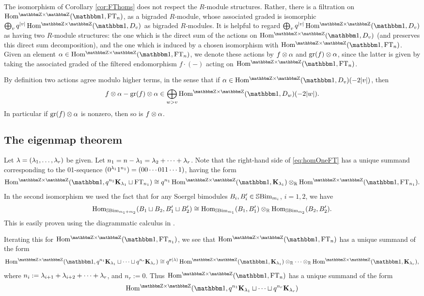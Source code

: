 The isomorphism of Corollary \ref{cor:FThoms} does not respect the $R$-module structures.  Rather, there is a filtration on $\Homgg(\one,\FT_n)$, as a bigraded $R$-module, whose associated graded is isomorphic $\bigoplus_v q^{|v|} \Homgg(\one,D_v)$ as bigraded $R$-modules.  It is helpful to regard $\bigoplus_v q^{|v|}\Homgg(\one,D_v)$ as having two $R$-module structures: the one which is the direct sum of the actions on $\Homgg(\one,D_v)$ (and preserves this direct sum decomposition), and the one which is induced by a chosen isomorphism with $\Homgg(\one,\FT_n)$.  Given an element $\a\in \Homgg(\one,\FT_n)$, we denote these actions by $f\otimes \alpha$ and $\operatorname{gr}(f)\otimes \alpha$, since the latter is given by taking the associated graded of the filtered endomorphism $f\cdot (-)$ acting on $\Homgg(\one,\FT_n)$.

By definition two actions agree modulo higher terms, in the sense that if $\a\in \Homgg(\one,D_v)(-2|v|)$, then
\begin{equation} \label{eq:fvsgrf}
f\ot \a-  \gr(f)\ot \a\in \bigoplus_{w>v}\Homgg(\one,D_w)(-2|w|).
\end{equation}
In particular if $\operatorname{gr}(f)\otimes \alpha$ is nonzero, then so is $f\otimes \alpha$.


\subsection{The eigenmap theorem}
\label{subsec:eigenmaptheorem}

Let $\lambda=(\lambda_1,\ldots,\lambda_r)$ be given.  Let $n_1 = n - \lambda_1 = \lambda_2 + \cdots + \lambda_r$.  Note that the right-hand side of \eqref{eq:homOneFT} has a unique summand corresponding to the 01-sequence $(0^{\lambda_1}1^{n_1}) = (00\cdots 011\cdots 1)$, having the form
\[
\Homgg(\one, q^{n_1}\KB_{\l_1}\sqcup \FT_{n_1}) \cong q^{n_1}\Homgg(\one, \KB_{\l_1})\ot_\RM \Homgg(\one,\FT_{n_1}).
\]
In the second isomorphism we used the fact that for any Soergel bimodules $B_i,B_i'\in {\mathbb{S}}{\rm Bim }_{m_i}$, $i=1,2$, we have
\[
\operatorname{Hom}_{{\mathbb{S}}{\rm Bim }_{m_1+m_2}}(B_1\sqcup B_2, B_1'\sqcup B_2')\cong \operatorname{Hom}_{{\mathbb{S}}{\rm Bim }_{m_1}}(B_1,B_1')\otimes_{\mathbb{R}} \operatorname{Hom}_{{\mathbb{S}}{\rm Bim }_{m_2}}(B_2,B_2').
\]
This is easily proven using the diagrammatic calculus in \cite{EKho}.


Iterating this for $\Homgg(\one,\FT_{n_1})$, we see that $\Homgg(\one,\FT_n)$ has a unique summand of the form
\[
 \Homgg(\one, q^{n_1} \KB_{\l_1}\sqcup \cdots \sqcup  q^{n_r}\KB_{\l_r})  \cong  q^{\rbb(\l)}\Homgg(\one,\KB_{\l_1})\ot_\RM\cdots \ot_\RM\Homgg(\one,\KB_{\l_r}),
 \]
where $n_i:=\lambda_{i+1}+\lambda_{i+2}+\cdots+\lambda_r$, and $n_r := 0$.  Thus $\Homgg(\one,\FT_n)$ has a unique summand of the form
\begin{equation}\label{eq:specialSummand}
\Homgg(\one, q^{n_1} \KB_{\l_1}\sqcup \cdots \sqcup  q^{n_r}\KB_{\l_r})%
\end{equation}


